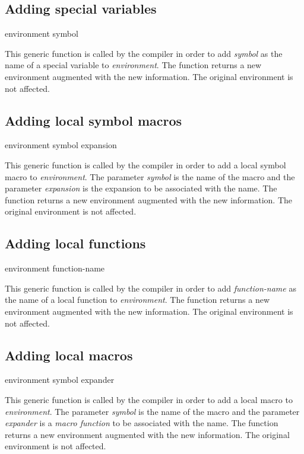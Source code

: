 \subsection{Adding special variables}

 {environment symbol}

This generic function is called by the compiler in order to add
\textit{symbol} as the name of a special variable to
\textit{environment}.  The function returns a new environment
augmented with the new information.  The original environment is not
affected.

\subsection{Adding local symbol macros}

 {environment symbol expansion}

This generic function is called by the compiler in order to add a
local symbol macro to \textit{environment}.  The parameter
\textit{symbol} is the name of the macro and the parameter
\textit{expansion} is the expansion to be associated with the name.
The function returns a new environment augmented with the new
information.  The original environment is not affected.

\subsection{Adding local functions}

 {environment function-name}

This generic function is called by the compiler in order to add
\textit{function-name} as the name of a local function to
\textit{environment}.  The function returns a new environment
augmented with the new information.  The original environment is not
affected.

\subsection{Adding local macros}

 {environment symbol expander}

This generic function is called by the compiler in order to add a
local macro to \textit{environment}.  The parameter \textit{symbol} is
the name of the macro and the parameter \textit{expander} is a
\emph{macro function} to be associated with the name.  The function
returns a new environment augmented with the new information.  The
original environment is not affected.

